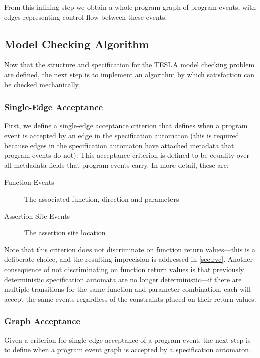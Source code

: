 From this inlining step we obtain a whole-program graph of program events, with
edges representing control flow between these events.

\subsection{Model Checking Algorithm}

Now that the structure and specification for the TESLA model checking problem
are defined, the next step is to implement an algorithm by which satisfaction
can be checked mechanically.

\subsubsection{Single-Edge Acceptance}

First, we define a single-edge acceptance criterion that defines when a program
event is accepted by an edge in the specification automaton (this is required
because edges in the specification automaton have attached metadata that program
events do not). This acceptance criterion is defined to be equality over all
metdadata fields that program events carry. In more detail, these are:
\begin{description}
  \item[Function Events] The associated function, direction and parameters
  \item[Assertion Site Events] The assertion site location
\end{description}
Note that this criterion does not discriminate on function return values---this
is a deliberate choice, and the resulting imprecision is addressed in
\autoref{sec:rvc}. Another consequence of not discriminating on function return
values is that previously deterministic specification automata are no longer
deterministic---if there are multiple transitions for the same function and
parameter combination, each will accept the same events regardless of the
constraints placed on their return values.

\subsubsection{Graph Acceptance}

Given a criterion for single-edge acceptance of a program event, the next step
is to define when a program event graph is accepted by a specification
automaton.

